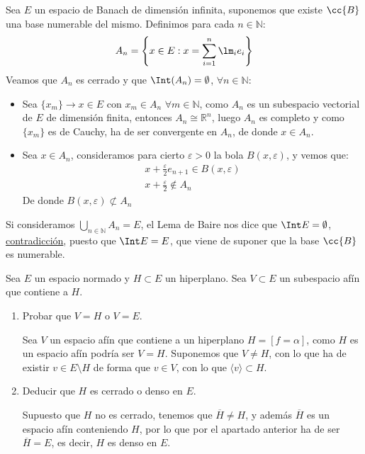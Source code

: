 \begin{ejercicio}
\begin{enumerate}[label=\alph*)]
            Sea $E$ un espacio de Banach de dimensión infinita, suponemos que existe $\cc{B}$ una base numerable del mismo. Definimos para cada $n\in \mathbb{N}$:
            \begin{equation*}
                A_n = \left\{x\in E : x = \sum_{i=1}^{n}\lm_i e_{i}\right\}
            \end{equation*}
            Veamos que $A_n$ es cerrado y que $\Int(A_n)=\emptyset $, $\forall n\in \mathbb{N}$:
            \begin{itemize}
                \item Sea $\{x_m\}\to x\in E$ con $x_m\in A_n$ $\forall m\in \mathbb{N}$, como $A_n$ es un subespacio vectorial de $E$ de dimensión finita, entonces $A_n\cong \mathbb{R}^n$, luego $A_n$ es completo y como $\{x_m\}$ es de Cauchy, ha de ser convergente en $A_n$, de donde $x\in A_n$.
                \item Sea $x\in A_n$, consideramos para cierto $\varepsilon>0$ la bola $B(x,\varepsilon)$, y vemos que:
                    \begin{gather*}
                        x+\frac{\varepsilon}{2} e_{n+1}\in B(x,\varepsilon) \\
                        x+\frac{\varepsilon}{2}\notin A_n
                    \end{gather*}
                    De donde $B(x,\varepsilon)\not\subset A_n$
            \end{itemize}
            Si consideramos $\bigcup_{n\in \mathbb{N}}A_n = E$, el Lema de Baire nos dice que $\Int E = \emptyset $, \underline{contradicción}, puesto que $\Int E = E$, que viene de suponer que la base $\cc{B}$ es numerable.
    \end{enumerate}
\end{ejercicio}

\begin{ejercicio} %
    Sea $E$ un espacio normado y $H\subset E$ un hiperplano. Sea $V\subset E$ un subespacio afín que contiene a $H$.
    \begin{enumerate}[label=\alph*)]
        \item Probar que $V=H$ o $V=E$.

            Sea $V$ un espacio afín que contiene a un hiperplano $H =[f=\alpha]$, como $H$ es un espacio afín podría ser $V=H$. Suponemos que $V\neq H$, con lo que ha de existir $v\in E\setminus H$ de forma que $v\in V$, con lo que $\langle v \rangle \subset H$. %
        \item Deducir que $H$ es cerrado o denso en $E$.

            Supuesto que $H$ no es cerrado, tenemos que $\overline{H}\neq H$, y además $\overline{H}$ es un espacio afín conteniendo $H$, por lo que por el apartado anterior ha de ser $\overline{H}=E$, es decir, $H$ es denso en $E$.
    \end{enumerate}
\end{ejercicio}

